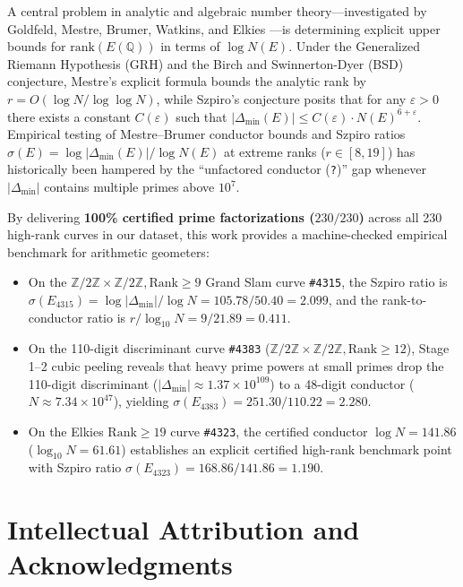 \documentclass[10pt,a4paper]{article}
\theoremstyle{plain}
\theoremstyle{definition}
\theoremstyle{remark}
\begin{document}
A central problem in analytic and algebraic number theory---investigated by Goldfeld, Mestre, Brumer, Watkins, and Elkies \cite{cremona1997algorithms,elkies2006high,silverman1986arithmetic}---is determining explicit upper bounds for $\mathrm{rank}(E(\mathbb{Q}))$ in terms of $\log N(E)$. Under the Generalized Riemann Hypothesis (GRH) and the Birch and Swinnerton-Dyer (BSD) conjecture, Mestre's explicit formula bounds the analytic rank by $r = O(\log N / \log \log N)$, while Szpiro's conjecture posits that for any $\varepsilon > 0$ there exists a constant $C(\varepsilon)$ such that $|\Delta_{\min}(E)| \le C(\varepsilon) \cdot N(E)^{6 + \varepsilon}$. Empirical testing of Mestre--Brumer conductor bounds and Szpiro ratios $\sigma(E) = \log |\Delta_{\min}(E)| / \log N(E)$ at extreme ranks ($r \in [8, 19]$) has historically been hampered by the ``unfactored conductor (\texttt{?})'' gap whenever $|\Delta_{\min}|$ contains multiple primes above $10^7$.

By delivering \textbf{100\% certified prime factorizations ($230/230$)} across all 230 high-rank curves in our dataset, this work provides a machine-checked empirical benchmark for arithmetic geometers:
\begin{itemize}[leftmargin=2em]
    \item On the $\mathbb{Z}/2\mathbb{Z} \times \mathbb{Z}/2\mathbb{Z}, \mathrm{Rank} \ge 9$ Grand Slam curve \texttt{\#4315}, the Szpiro ratio is $\sigma(E_{4315}) = \log |\Delta_{\min}| / \log N = 105.78 / 50.40 = 2.099$, and the rank-to-conductor ratio is $r / \log_{10} N = 9 / 21.89 = 0.411$.
    \item On the 110-digit discriminant curve \texttt{\#4383} ($\mathbb{Z}/2\mathbb{Z} \times \mathbb{Z}/2\mathbb{Z}, \mathrm{Rank} \ge 12$), Stage 1--2 cubic peeling reveals that heavy prime powers at small primes drop the 110-digit discriminant ($|\Delta_{\min}| \approx 1.37 \times 10^{109}$) to a 48-digit conductor ($N \approx 7.34 \times 10^{47}$), yielding $\sigma(E_{4383}) = 251.30 / 110.22 = 2.280$.
    \item On the Elkies $\mathrm{Rank} \ge 19$ curve \texttt{\#4323}, the certified conductor $\log N = 141.86$ ($\log_{10} N = 61.61$) establishes an explicit certified high-rank benchmark point with Szpiro ratio $\sigma(E_{4323}) = 168.86 / 141.86 = 1.190$.
\end{itemize}

\section{Intellectual Attribution and Acknowledgments}
\end{document}
